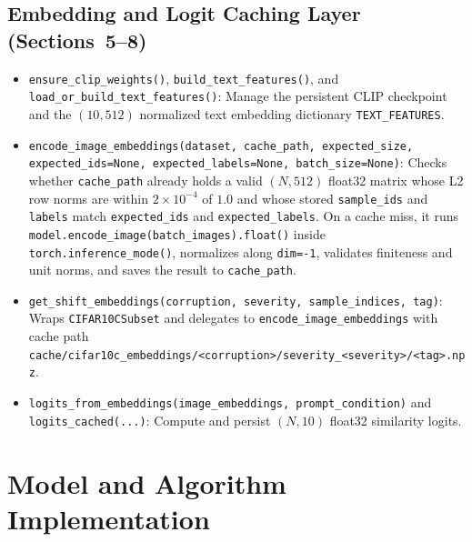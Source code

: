 \documentclass[11pt,a4paper]{article}
\begin{document}
\subsection{Embedding and Logit Caching Layer (Sections~5--8)}
\begin{itemize}
  \item \texttt{ensure\_\allowbreak{}clip\_\allowbreak{}weights()}, \texttt{build\_\allowbreak{}text\_\allowbreak{}features()}, and \texttt{load\_\allowbreak{}or\_\allowbreak{}build\_\allowbreak{}text\_\allowbreak{}features()}: Manage the persistent CLIP checkpoint and the $(10, 512)$ normalized text embedding dictionary \texttt{TEXT\_\allowbreak{}FEATURES}.
  \item \texttt{encode\_\allowbreak{}image\_\allowbreak{}embeddings(dataset, cache\_\allowbreak{}path, expected\_\allowbreak{}size, expected\_\allowbreak{}ids=None, expected\_\allowbreak{}labels=None, batch\_\allowbreak{}size=None)}: Checks whether \texttt{cache\_\allowbreak{}path} already holds a valid $(N, 512)$ float32 matrix whose L2 row norms are within $2 \times 10^{-4}$ of $1.0$ and whose stored \texttt{sample\_\allowbreak{}ids} and \texttt{labels} match \texttt{expected\_\allowbreak{}ids} and \texttt{expected\_\allowbreak{}labels}. On a cache miss, it runs \texttt{model.encode\_\allowbreak{}image(batch\_\allowbreak{}images).float()} inside \texttt{torch.inference\_\allowbreak{}mode()}, normalizes along \texttt{dim=-1}, validates finiteness and unit norms, and saves the result to \texttt{cache\_\allowbreak{}path}.
  \item \texttt{get\_\allowbreak{}shift\_\allowbreak{}embeddings(corruption, severity, sample\_\allowbreak{}indices, tag)}: Wraps \texttt{CIFAR10CSubset} and delegates to \texttt{encode\_\allowbreak{}image\_\allowbreak{}embeddings} with cache path \texttt{cache/\allowbreak{}cifar10c\_\allowbreak{}embeddings/\allowbreak{}<corruption>/\allowbreak{}severity\_\allowbreak{}<severity>/\allowbreak{}<tag>.npz}.
  \item \texttt{logits\_\allowbreak{}from\_\allowbreak{}embeddings(image\_\allowbreak{}embeddings, prompt\_\allowbreak{}condition)} and \texttt{logits\_\allowbreak{}cached(...)}: Compute and persist $(N, 10)$ float32 similarity logits.
\end{itemize}

\section{Model and Algorithm Implementation}
\label{sec:algorithms}
\end{document}
